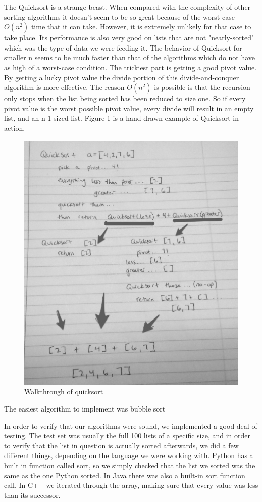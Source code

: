 \documentclass[12pt]{amsart}
\begin{document}
The Quicksort is a strange beast. When compared with the complexity of other
sorting algorithms it doesn't seem to be so great because of the worst case $O(n^2)$ time that it can take. However, it is extremely unlikely for that case to take place. Its performance is also very good on lists that are not "nearly-sorted" which was the type of data we were feeding it.  The behavior of Quicksort for smaller n seems to be much faster than that of the algorithms which do not have as high of a worst-case condition. The
trickiest part is getting a good pivot value. By getting a lucky pivot value the
divide portion of this divide-and-conquer algorithm is more effective. The
reason $O(n^2)$ is possible is that the recursion only stops when the list being
sorted has been reduced to size one. So if every pivot value is the worst
possible pivot value, every divide will result in an empty list, and an n-1
sized list. Figure 1 is a hand-drawn example of Quicksort in action.
\begin{figure}[h]
  \centering
    \includegraphics[width=.7\textwidth]{quicksort-drawing.jpg}
  \caption{Walkthrough of quicksort}
\end{figure}

The easiest algorithm to implement was bubble sort

In order to verify that our algorithms were sound, we implemented a good deal of
testing. The test set was usually the full 100 lists of a specific size, and in
order to verify that the list in question is actually sorted afterwards, we did
a few different things, depending on the language we were working with. Python
has a built in function called sort, so we simply checked that the list we
sorted was the same as the one Python sorted. In Java there was also a built-in
sort function call. In C++ we iterated through the array, making sure that every
value was less than its successor.
\end{document}
